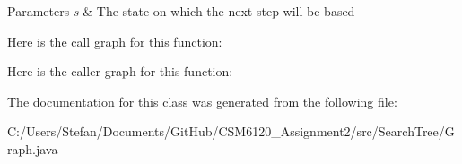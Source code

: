 \begin{DoxyParams}{Parameters}
{\em s} & The state on which the next step will be based \\
\hline
\end{DoxyParams}


Here is the call graph for this function\+:




Here is the caller graph for this function\+:




The documentation for this class was generated from the following file\+:\begin{DoxyCompactItemize}
\item 
C\+:/\+Users/\+Stefan/\+Documents/\+Git\+Hub/\+C\+S\+M6120\+\_\+\+Assignment2/src/\+Search\+Tree/Graph.\+java\end{DoxyCompactItemize}
